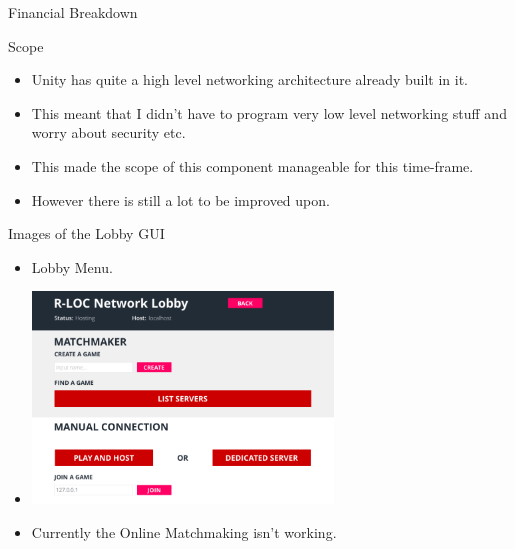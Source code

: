 \documentclass{beamer}
\begin{document}
\begin{frame}{Financial Breakdown}
	\par
\end{frame}


























\begin{frame}{Scope}
	\begin{itemize}
		\item Unity has quite a high level networking architecture already built in it.  \pause
		\item This meant that I didn't have to program very low level networking stuff and worry about security etc. \pause
		\item This made the scope of this component manageable for this time-frame. \pause
		\item However there is still a lot to be improved upon.
	\end{itemize}
\end{frame}

\begin{frame}{Images of the Lobby GUI}
	\begin{itemize}
		\item Lobby Menu. \pause
		\item \includegraphics[width=8cm]{LobbyGUI} \pause
		\item Currently the Online Matchmaking isn't working.
	\end{itemize}
\end{frame}
\end{document}
